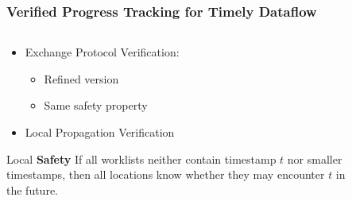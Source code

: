 \documentclass[aspectratio=169,10pt]{beamer}
\begin{document}
\begin{frame}
  \frametitle{Verified Progress Tracking for Timely Dataflow}
  \begin{columns}
    \begin{column}{.45\textwidth}
      \begin{itemize}
        \item Exchange Protocol Verification:
              \begin{itemize}
                \item Refined version
                \item Same safety property
              \end{itemize}
              \pause
        \item Local Propagation Verification
      \end{itemize}
      \begin{block}{Local \textbf{Safety}}
        If all worklists neither contain timestamp $t$ nor smaller timestamps, then all locations know whether they may encounter $t$ in the future.
      \end{block}
    \end{column}
    \begin{column}{.45\textwidth}
      \begin{figure}
      \end{figure}
    \end{column}
  \end{columns}
\end{frame}
\end{document}
